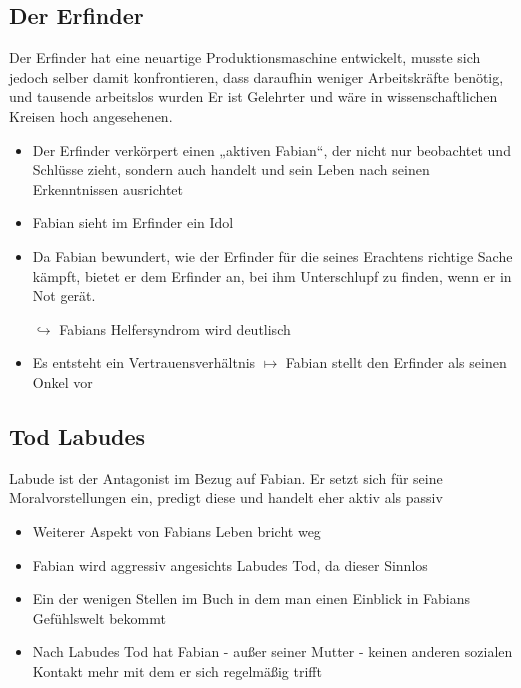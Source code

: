 \documentclass[a4paper,9pt]{article}
\begin{document}
\subsection{Der Erfinder}
Der Erfinder hat eine neuartige Produktionsmaschine entwickelt, musste sich jedoch selber damit konfrontieren, dass daraufhin weniger Arbeitskräfte benötig, und tausende arbeitslos wurden
Er ist Gelehrter und wäre in wissenschaftlichen Kreisen hoch angesehenen.
\begin{itemize}
 \item Der Erfinder verkörpert einen „aktiven Fabian“, der nicht nur beobachtet und Schlüsse zieht, sondern auch handelt und sein Leben nach seinen Erkenntnissen ausrichtet
 \item Fabian sieht im Erfinder ein Idol
 \item Da Fabian bewundert, wie der Erfinder für die seines Erachtens richtige Sache kämpft, bietet er dem Erfinder an, bei ihm Unterschlupf zu finden, wenn er in Not gerät.
 \item[$\hookrightarrow$]Fabians Helfersyndrom wird deutlisch
 \item Es entsteht ein Vertrauensverhältnis $\mapsto$ Fabian stellt den Erfinder als seinen Onkel vor
\end{itemize}

\subsection{Tod Labudes}
Labude ist der Antagonist im Bezug auf Fabian. Er setzt sich für seine Moralvorstellungen ein, predigt diese und handelt eher aktiv als passiv
\begin{itemize}
 \item Weiterer Aspekt von Fabians Leben bricht weg
 \item Fabian wird aggressiv angesichts Labudes Tod, da dieser Sinnlos
 \item Ein der wenigen Stellen im Buch in dem man einen Einblick in Fabians Gefühlswelt bekommt
 \item Nach Labudes Tod hat Fabian - außer seiner Mutter - keinen anderen sozialen Kontakt mehr mit dem er sich regelmäßig trifft
\end{itemize}
\end{document}
